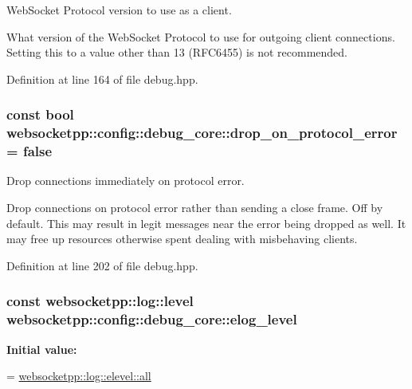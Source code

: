 Web\+Socket Protocol version to use as a client. 

What version of the Web\+Socket Protocol to use for outgoing client connections. Setting this to a value other than 13 (R\+F\+C6455) is not recommended. 

Definition at line 164 of file debug.\+hpp.

\subsubsection[{\texorpdfstring{drop\+\_\+on\+\_\+protocol\+\_\+error}{drop\_on\_protocol\_error}}]{\setlength{\rightskip}{0pt plus 5cm}const bool websocketpp\+::config\+::debug\+\_\+core\+::drop\+\_\+on\+\_\+protocol\+\_\+error = false\hspace{0.3cm}{\ttfamily [static]}}\hypertarget{structwebsocketpp_1_1config_1_1debug__core_a0f046a730b161555c644dc40df9ea870}{}\label{structwebsocketpp_1_1config_1_1debug__core_a0f046a730b161555c644dc40df9ea870}


Drop connections immediately on protocol error. 

Drop connections on protocol error rather than sending a close frame. Off by default. This may result in legit messages near the error being dropped as well. It may free up resources otherwise spent dealing with misbehaving clients. 

Definition at line 202 of file debug.\+hpp.

\subsubsection[{\texorpdfstring{elog\+\_\+level}{elog\_level}}]{\setlength{\rightskip}{0pt plus 5cm}const websocketpp\+::log\+::level websocketpp\+::config\+::debug\+\_\+core\+::elog\+\_\+level\hspace{0.3cm}{\ttfamily [static]}}\hypertarget{structwebsocketpp_1_1config_1_1debug__core_a0f2c26586b53faefef4386473092886e}{}\label{structwebsocketpp_1_1config_1_1debug__core_a0f2c26586b53faefef4386473092886e}
{\bfseries Initial value\+:}
\begin{DoxyCode}
=
        \hyperlink{structwebsocketpp_1_1log_1_1elevel_a9b31ff708c221d314f9f4eb3ff2b1ad7}{websocketpp::log::elevel::all}
\end{DoxyCode}


